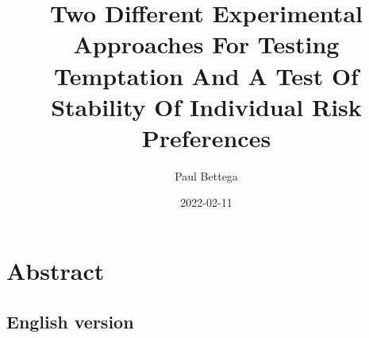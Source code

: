\documentclass[
]{book}
\title{Two Different Experimental Approaches For Testing Temptation And A Test Of Stability Of Individual Risk Preferences}
\author{Paul Bettega}
\date{2022-02-11}
\begin{document}
\maketitle

{
\setcounter{tocdepth}{1}
\tableofcontents
}
\hypertarget{abstract}{%
\chapter*{Abstract}\label{abstract}}

\hypertarget{english-version}{%
\section*{English version}\label{english-version}}
\end{document}
